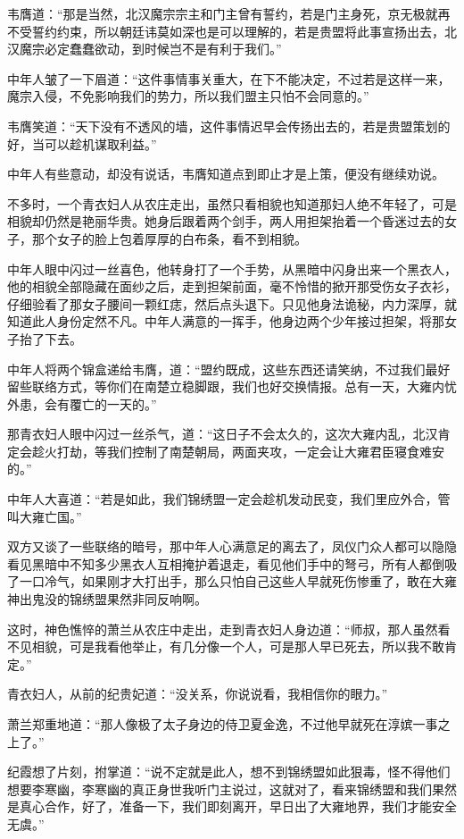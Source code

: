 韦膺道：“那是当然，北汉魔宗宗主和门主曾有誓约，若是门主身死，京无极就再不受誓约约束，所以朝廷讳莫如深也是可以理解的，若是贵盟将此事宣扬出去，北汉魔宗必定蠢蠢欲动，到时候岂不是有利于我们。”

中年人皱了一下眉道：“这件事情事关重大，在下不能决定，不过若是这样一来，魔宗入侵，不免影响我们的势力，所以我们盟主只怕不会同意的。”

韦膺笑道：“天下没有不透风的墙，这件事情迟早会传扬出去的，若是贵盟策划的好，当可以趁机谋取利益。”

中年人有些意动，却没有说话，韦膺知道点到即止才是上策，便没有继续劝说。

不多时，一个青衣妇人从农庄走出，虽然只看相貌也知道那妇人绝不年轻了，可是相貌却仍然是艳丽华贵。她身后跟着两个剑手，两人用担架抬着一个昏迷过去的女子，那个女子的脸上包着厚厚的白布条，看不到相貌。

中年人眼中闪过一丝喜色，他转身打了一个手势，从黑暗中闪身出来一个黑衣人，他的相貌全部隐藏在面纱之后，走到担架前面，毫不怜惜的掀开那受伤女子衣衫，仔细验看了那女子腰间一颗红痣，然后点头退下。只见他身法诡秘，内力深厚，就知道此人身份定然不凡。中年人满意的一挥手，他身边两个少年接过担架，将那女子抬了下去。

中年人将两个锦盒递给韦膺，道：“盟约既成，这些东西还请笑纳，不过我们最好留些联络方式，等你们在南楚立稳脚跟，我们也好交换情报。总有一天，大雍内忧外患，会有覆亡的一天的。”

那青衣妇人眼中闪过一丝杀气，道：“这日子不会太久的，这次大雍内乱，北汉肯定会趁火打劫，等我们控制了南楚朝局，两面夹攻，一定会让大雍君臣寝食难安的。”

中年人大喜道：“若是如此，我们锦绣盟一定会趁机发动民变，我们里应外合，管叫大雍亡国。”

双方又谈了一些联络的暗号，那中年人心满意足的离去了，凤仪门众人都可以隐隐看见黑暗中不知多少黑衣人互相掩护着退走，看见他们手中的弩弓，所有人都倒吸了一口冷气，如果刚才大打出手，那么只怕自己这些人早就死伤惨重了，敢在大雍神出鬼没的锦绣盟果然非同反响啊。

这时，神色憔悴的萧兰从农庄中走出，走到青衣妇人身边道：“师叔，那人虽然看不见相貌，可是我看他举止，有几分像一个人，可是那人早已死去，所以我不敢肯定。”

青衣妇人，从前的纪贵妃道：“没关系，你说说看，我相信你的眼力。”

萧兰郑重地道：“那人像极了太子身边的侍卫夏金逸，不过他早就死在淳嫔一事之上了。”

纪霞想了片刻，拊掌道：“说不定就是此人，想不到锦绣盟如此狠毒，怪不得他们想要李寒幽，李寒幽的真正身世我听门主说过，这就对了，看来锦绣盟和我们果然是真心合作，好了，准备一下，我们即刻离开，早日出了大雍地界，我们才能安全无虞。”

